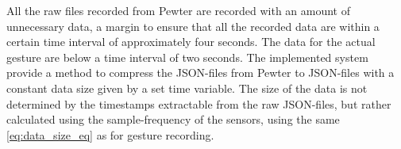 All the raw files recorded from Pewter are recorded with an amount of unnecessary data, a margin to ensure that all the recorded data are within a certain time interval of approximately four seconds. The data for the actual gesture are below a time interval of two seconds. The implemented system provide a method to compress the JSON-files from Pewter to JSON-files with a constant data size given by a set time variable. The size of the data is not determined by the timestamps extractable from the raw JSON-files, but rather calculated using the sample-frequency of the sensors, using the same \cref{eq:data_size_eq} as for gesture recording.